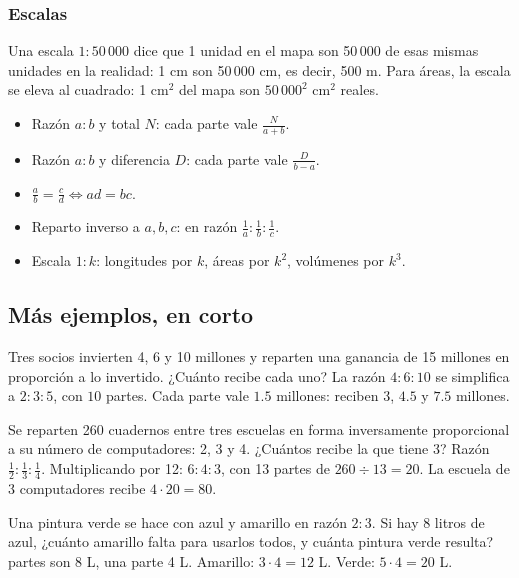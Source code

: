 \subsubsection{Escalas}
Una escala $1 : 50\,000$ dice que 1 unidad en el mapa son 50\,000 de esas mismas unidades en la realidad: 1 cm son
50\,000 cm, es decir, 500 m. Para áreas, la escala se eleva al cuadrado: 1 cm$^2$ del mapa son $50\,000^2$ cm$^2$
reales.

\begin{regla}
\begin{itemize}
  \item Razón $a : b$ y total $N$: cada parte vale $\tfrac{N}{a + b}$.
  \item Razón $a : b$ y diferencia $D$: cada parte vale $\tfrac{D}{b - a}$.
  \item $\tfrac ab = \tfrac cd \iff ad = bc$.
  \item Reparto inverso a $a, b, c$: en razón $\tfrac1a : \tfrac1b : \tfrac1c$.
  \item Escala $1 : k$: longitudes por $k$, áreas por $k^2$, volúmenes por $k^3$.
\end{itemize}
\end{regla}

\subsection{Más ejemplos, en corto}
\begin{ejemplo}
Tres socios invierten 4, 6 y 10 millones y reparten una ganancia de 15 millones en proporción a lo invertido. ¿Cuánto
recibe cada uno?
\solucion La razón $4 : 6 : 10$ se simplifica a $2 : 3 : 5$, con $10$ partes. Cada parte vale $1.5$ millones: reciben
$3$, $4.5$ y $7.5$ millones.
\end{ejemplo}

\begin{ejemplo}
Se reparten 260 cuadernos entre tres escuelas en forma inversamente proporcional a su número de computadores: 2, 3 y 4.
¿Cuántos recibe la que tiene 3?
\solucion Razón $\tfrac12 : \tfrac13 : \tfrac14$. Multiplicando por 12: $6 : 4 : 3$, con 13 partes de $260 \div 13 =
20$. La escuela de 3 computadores recibe $4 \cdot 20 = 80$.
\end{ejemplo}

\begin{ejemplo}[Mezclas]
Una pintura verde se hace con azul y amarillo en razón $2 : 3$. Si hay 8 litros de azul, ¿cuánto amarillo falta para
usarlos todos, y cuánta pintura verde resulta?
 partes son 8 L, una parte 4 L. Amarillo: $3 \cdot 4 = 12$ L. Verde: $5 \cdot 4 = 20$ L.
\end{ejemplo}

